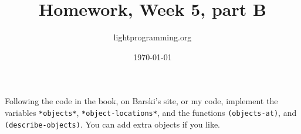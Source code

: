 \documentclass{article}
\title{Homework, Week 5, part B}
\author{lightprogramming.org}
\date{\today}
\begin{document}
\maketitle{}

Following the code in the book, on Barski's site, or my code, implement the variables \texttt{*objects*}, \texttt{*object-locations*}, and the functions \texttt{(objects-at)}, and \texttt{(describe-objects)}. You can add extra objects if you like.
\end{document}
